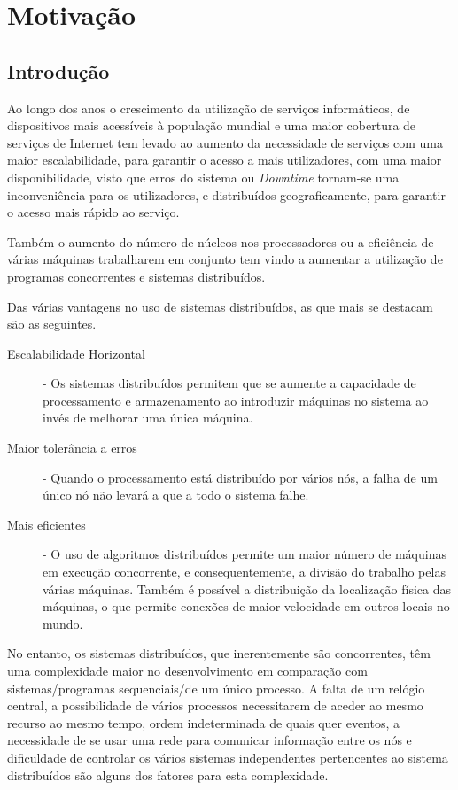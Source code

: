 \chapter{Motivação}
\label{chap:motivacao}

\section{Introdução}
\label{motivacao:sec:introducao}



Ao longo dos anos o crescimento da utilização de serviços informáticos, de dispositivos mais acessíveis à população mundial e uma maior cobertura de serviços de Internet
tem levado ao aumento da necessidade de serviços com uma maior escalabilidade, para garantir o acesso a mais utilizadores, com uma maior disponibilidade, 
visto que erros do sistema ou \emph{Downtime} tornam-se uma inconveniência para os utilizadores,
e distribuídos geograficamente, para garantir o acesso mais rápido ao serviço.

Também o aumento do número de núcleos nos processadores ou a eficiência de várias máquinas trabalharem em conjunto
tem vindo a aumentar a utilização de programas concorrentes e sistemas distribuídos.

Das várias vantagens no uso de sistemas distribuídos, as que mais se destacam são as seguintes.
\begin{description}
    \item [Escalabilidade Horizontal] - Os sistemas distribuídos permitem que se aumente a capacidade de processamento
	e armazenamento ao introduzir máquinas no sistema ao invés de melhorar uma única máquina.
	
    \item [Maior tolerância a erros] - Quando o processamento está distribuído por vários nós, a falha de um único nó não levará a que a todo o sistema falhe.

    \item [Mais eficientes] - O uso de algoritmos distribuídos permite um maior número de máquinas em execução concorrente, e consequentemente, a divisão do trabalho pelas várias máquinas.
	Também é possível a distribuição da localização física das máquinas, o que permite conexões de maior velocidade em outros locais no mundo.

\end{description}

No entanto, os sistemas distribuídos, que inerentemente são concorrentes,
têm uma complexidade maior no desenvolvimento em comparação com sistemas/programas sequenciais/de um único processo.
A falta de um relógio central,
a possibilidade de vários processos necessitarem de aceder ao mesmo recurso ao mesmo tempo,
ordem indeterminada de quais quer eventos,
a necessidade de se usar uma rede para comunicar informação entre os nós e dificuldade de controlar 
os vários sistemas independentes pertencentes ao sistema distribuídos são alguns dos fatores para esta complexidade.

